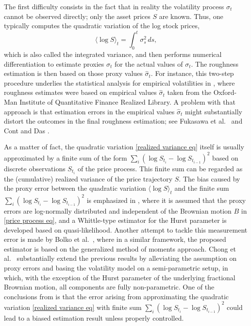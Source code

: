 \documentclass[12pt,reqno]{article}
\def\wh{\widehat}
\numberwithin{equation}{section}
\theoremstyle{definition}
\def\<{\langle}
\def\>{\rangle}
\def\wh{\widehat}
\begin{document}
 
 The first difficulty consists in the fact that in reality the volatility process $\sigma_t$ cannot be observed directly; only the asset prices $S$ are known. Thus, one typically computes the quadratic variation of the log stock prices, 
 \begin{equation}\label{realized variance eq}
 \<\log S\>_t = \int_{0}^{t}\sigma^2_s \,ds,
 \end{equation}
which is also called the integrated variance, and then performs numerical differentiation to estimate proxies $\wh\sigma_t$ for the actual values of $\sigma_t$. The roughness estimation is then based on those proxy values  $\wh\sigma_t$. For instance, this two-step procedure underlies  the statistical analysis for empirical volatilities in \cite{GatheralRosenbaum}, where roughness estimates were based on empirical values  $\wh\sigma_t$  taken from the Oxford-Man Institute of Quantitative Finance Realized Library. A problem with that approach is that estimation errors in the empirical values $\wh\sigma_t$ might substantially distort the outcomes in the final roughness estimation;  see Fukasawa et al.~\cite{Fukasawa2022Estimation} and Cont and Das \cite{ContDasArtefact}.

As a matter of fact, the quadratic variation \eqref{realized variance eq} itself is usually approximated by a finite sum of the form $\sum_i(\log S_{t_i}-\log S_{t_{i-1}})^2$ based on discrete observations $ S_{t_i}$ of the price process. This finite sum can be regarded as the (cumulative) realized variance of the price trajectory $S$. The bias caused by the proxy error between the quadratic variation $ \<\log S\>_t$ and the finite sum $\sum_i(\log S_{t_i}-\log S_{t_{i-1}})^2$ is emphasized in \cite{Fukasawa2022Estimation}, where it is assumed that the proxy errors are log-normally distributed and independent of the Brownian motion $B$ in \eqref{price process eq}, and a Whittle-type estimator for the Hurst parameter is developed based on quasi-likelihood. Another attempt to tackle this measurement error is made by Bolko et al.~\cite{BolkoPakkanen2022GMM}, where in a similar framework, the proposed estimator is based on the generalized method of moments approach. Chong et al.~\cite{Chong2022CLT, Chong2022Minimax} substantially extend the previous results by alleviating the assumption on proxy errors and basing the volatility model on a semi-parametric setup, in which,   with the exception of the Hurst parameter of the underlying fractional Brownian motion, all components are fully non-parametric. One of the conclusions from \cite{BolkoPakkanen2022GMM, Fukasawa2022Estimation, Chong2022CLT} is that the error arising from approximating the quadratic variation \eqref{realized variance eq} with finite sum $\sum_i(\log S_{t_i}-\log S_{t_{i-1}})^2$ could lead to a biased estimation result unless properly controlled.
\end{document}
